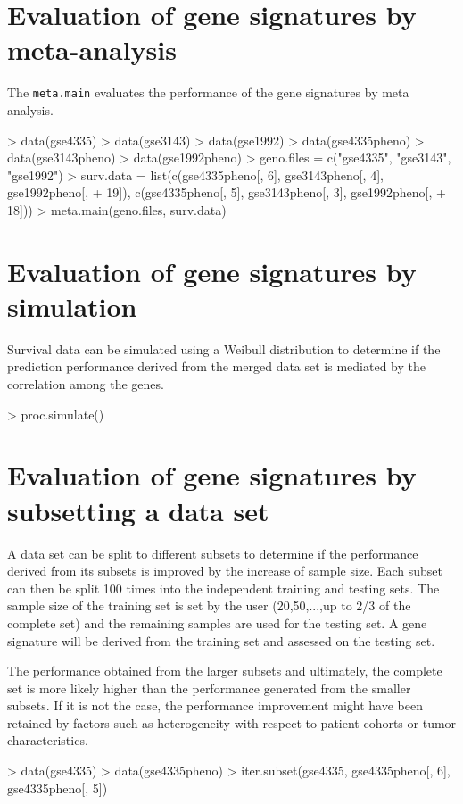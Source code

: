 \documentclass[a4paper]{article}
\begin{document}
\section{Evaluation of gene signatures by meta-analysis}
The \verb+meta.main+ evaluates the performance of the gene signatures by meta analysis.
\begin{Schunk}
\begin{Sinput}
> data(gse4335)
> data(gse3143)
> data(gse1992)
> data(gse4335pheno)
> data(gse3143pheno)
> data(gse1992pheno)
> geno.files = c("gse4335", "gse3143", "gse1992")
> surv.data = list(c(gse4335pheno[, 6], gse3143pheno[, 4], gse1992pheno[, 
+     19]), c(gse4335pheno[, 5], gse3143pheno[, 3], gse1992pheno[, 
+     18]))
> meta.main(geno.files, surv.data)
\end{Sinput}
\end{Schunk}
\section{Evaluation of gene signatures by simulation}
Survival data can be simulated using a Weibull distribution to determine if the prediction performance derived from the merged data set is mediated by the correlation among the genes.
\begin{Schunk}
\begin{Sinput}
> proc.simulate()
\end{Sinput}
\end{Schunk}
\section{Evaluation of gene signatures by subsetting a data set}
A data set can be split to different subsets to determine if the performance derived from its subsets
is improved by the increase of sample size. Each subset can then be split 100 times into the independent
training and testing sets. The sample size of the training set is set by the user (20,50,...,up
to 2/3 of the complete set) and the remaining samples are used for the testing set. A gene signature
will be derived from the training set and assessed on the testing set.

The performance obtained from the larger subsets and ultimately, the complete set is more likely
higher than the performance generated from the smaller subsets. If it is not the case, the performance
improvement might have been retained by factors such as heterogeneity with respect to patient cohorts or tumor characteristics.

\begin{Schunk}
\begin{Sinput}
> data(gse4335)
> data(gse4335pheno)
> iter.subset(gse4335, gse4335pheno[, 6], gse4335pheno[, 5])
\end{Sinput}
\end{Schunk}
\end{document}
